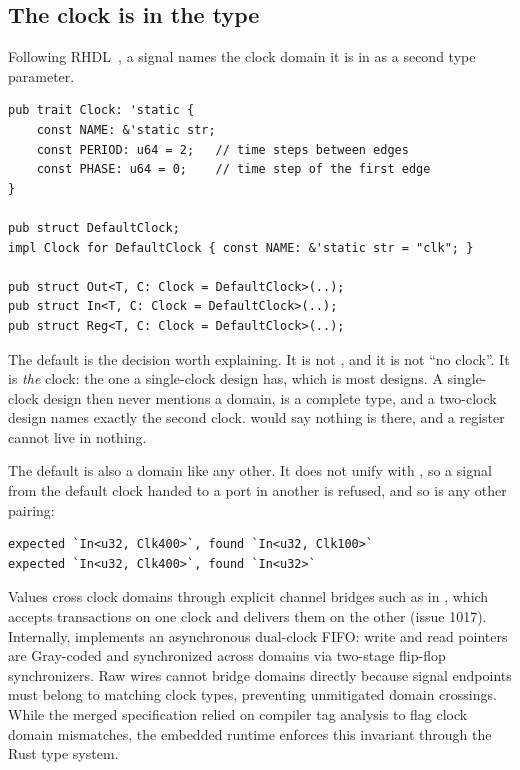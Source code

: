 \subsection{The clock is in the type}

Following RHDL~\cite{rhdl}, a signal names the clock domain it is in as a
second type parameter.

\begin{lstlisting}[caption={A signal knows its clock. \code{Clock} is a trait with a name and, from Section~\ref{sec:e-phase}, a period and a phase; the default is a named clock rather than an absence of one.},label={lst:clock}]
pub trait Clock: 'static {
    const NAME: &'static str;
    const PERIOD: u64 = 2;   // time steps between edges
    const PHASE: u64 = 0;    // time step of the first edge
}

pub struct DefaultClock;
impl Clock for DefaultClock { const NAME: &'static str = "clk"; }

pub struct Out<T, C: Clock = DefaultClock>(..);
pub struct In<T, C: Clock = DefaultClock>(..);
pub struct Reg<T, C: Clock = DefaultClock>(..);
\end{lstlisting}

The default is the decision worth explaining. It is not \code{()}, and
it is not ``no clock''. It is \emph{the} clock: the one a single-clock
design has, which is most designs. A single-clock design then never
mentions a domain,  is a complete type, and a two-clock
design names exactly the second clock. \code{()} would say nothing is
there, and a register cannot live in nothing.

The default is also a domain like any other. It does not unify with
, so a signal from the default clock handed to a port in
another is refused, and so is any other pairing:

\begin{lstlisting}[style=ascii,caption={A domain crossing without a crossing. Both are refused, the second showing the default is not a wildcard.},label={lst:clock-err}]
expected `In<u32, Clk400>`, found `In<u32, Clk100>`
expected `In<u32, Clk400>`, found `In<u32>`
\end{lstlisting}

Values cross clock domains through explicit channel bridges such as
 in , which accepts transactions on one
clock and delivers them on the other (issue 1017). Internally,
 implements an asynchronous dual-clock FIFO: write and
read pointers are Gray-coded and synchronized across domains via
two-stage flip-flop synchronizers. Raw wires cannot bridge domains
directly because signal endpoints must belong to matching clock types,
preventing unmitigated domain crossings. While the merged specification
relied on compiler tag analysis to flag clock domain mismatches, the
embedded runtime enforces this invariant through the Rust type system.

